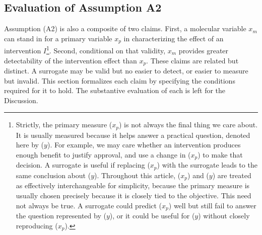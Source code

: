 \documentclass[twocolumn]{article} %
\begin{document}
\subsection{Evaluation of Assumption A2}


Assumption (A2) is also a composite of two claims. First, a molecular variable $x_m$ can stand in for a primary variable $x_p$ in characterizing the effect of an intervention $I$\footnote{Strictly, the primary measure ($x_p$) is not always the final thing we care about. It is usually measured because it helps answer a practical question, denoted here by ($y$). For example, we may care whether an intervention produces enough benefit to justify approval, and use a change in ($x_p$) to make that decision. A surrogate is useful if replacing ($x_p$) with the surrogate leads to the same conclusion about ($y$). Throughout this article, ($x_p$) and ($y$) are treated as effectively interchangeable for simplicity, because the primary measure is usually chosen precisely because it is closely tied to the objective. This need not always be true. A surrogate could predict ($x_p$) well but still fail to answer the question represented by ($y$), or it could be useful for ($y$) without closely reproducing ($x_p$).}. Second, conditional on that validity, $x_m$ provides greater detectability of the intervention effect than $x_p$. These claims are related but distinct. A surrogate may be valid but no easier to detect, or easier to measure but invalid. This section formalizes each claim by specifying the conditions required for it to hold. The substantive evaluation of each is left for the Discussion.
\end{document}
